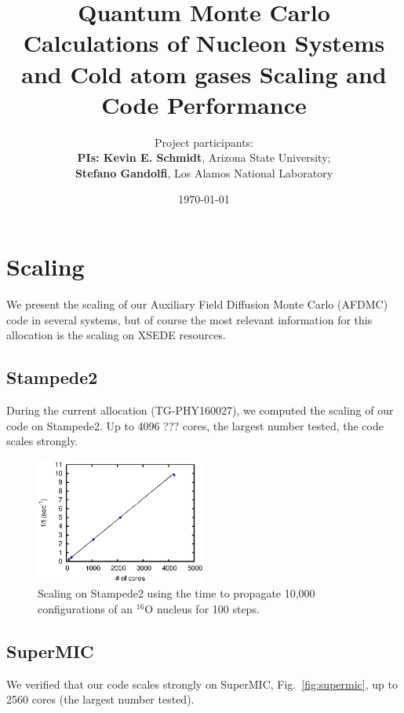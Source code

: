 \documentclass[12pt,letterpaper]{article}
\newcommand{\project}{\large Quantum Monte Carlo Calculations of Nucleon 
Systems and Cold atom gases \vskip 0.5cm}
\begin{document}
\onehalfspacing
\title{\project {\Large \textbf{Scaling and Code Performance}} \vspace{0cm}}
\author{
Project participants:\\
{\bf PIs: Kevin E. Schmidt}, Arizona State University; \\
{\bf Stefano Gandolfi}, Los Alamos National Laboratory\\
}
\date{\today}
\maketitle
\section{Scaling}
We present the scaling of our Auxiliary Field Diffusion Monte Carlo (AFDMC) 
code in several systems, but of course the 
most relevant information for this allocation is the scaling on XSEDE 
resources.

\subsection{Stampede2}

During the current allocation (TG-PHY160027), we computed
the scaling of our code
on Stampede2. Up to
{\color{red} 4096 ???}
cores, the 
largest number tested, the code scales strongly.

\begin{figure}[h]
   \centering
   \includegraphics[width=0.5\textwidth]{stampede.eps}
   \caption{Scaling on Stampede2 using the time to propagate 10,000 
   configurations of an $^{16}$O nucleus for 100 steps.}
   \label{fig:scaling}
\end{figure}

\subsection{SuperMIC}
We verified that our code scales 
strongly on SuperMIC, Fig.~\ref{fig:supermic}, up to 2560 cores (the largest 
number tested).
\end{document}

